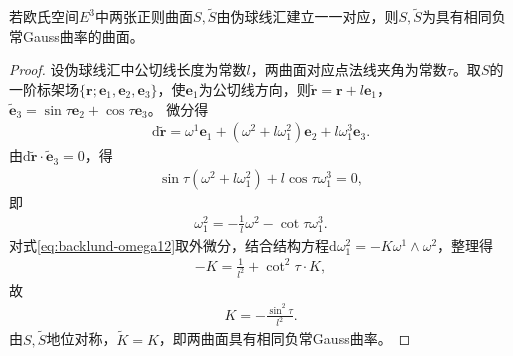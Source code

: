 \documentclass[../../main.tex]{subfiles}%
\begin{document}
\begin{theorem}[Bäcklund定理]
若欧氏空间$E^3$中两张正则曲面$S,\tilde{S}$由伪球线汇建立一一对应，则$S,\tilde{S}$为具有相同负常Gauss曲率的曲面。
\end{theorem}

\begin{proof}

设伪球线汇中公切线长度为常数$l$，两曲面对应点法线夹角为常数$\tau$。取$S$的一阶标架场$\{\boldsymbol{r};\boldsymbol{e}_1,\boldsymbol{e}_2,\boldsymbol{e}_3\}$，使$\boldsymbol{e}_1$为公切线方向，则$\tilde{\boldsymbol{r}}=\boldsymbol{r}+l\boldsymbol{e}_1$，$\tilde{\boldsymbol{e}}_3=\sin\tau\boldsymbol{e}_2+\cos\tau\boldsymbol{e}_3$。
微分得
\begin{align*}
\mathrm{d}\tilde{\boldsymbol{r}}=\omega^1\boldsymbol{e}_1+(\omega^2+l\omega_1^2)\boldsymbol{e}_2+l\omega_1^3\boldsymbol{e}_3.
\end{align*}
由$\mathrm{d}\tilde{\boldsymbol{r}}\cdot\tilde{\boldsymbol{e}}_3=0$，得
\begin{align*}
\sin\tau(\omega^2+l\omega_1^2)+l\cos\tau\omega_1^3=0,
\end{align*}
即
\begin{align}
\omega_1^2=-\frac{1}{l}\omega^2-\cot\tau\omega_1^3.\label{eq:backlund-omega12}
\end{align}
对式\eqref{eq:backlund-omega12}取外微分，结合结构方程$\mathrm{d}\omega_1^2=-K\omega^1\wedge\omega^2$，整理得
\begin{align*}
-K=\frac{1}{l^2}+\cot^2\tau\cdot K,
\end{align*}
故
\begin{align}
K=-\frac{\sin^2\tau}{l^2}.\label{eq:backlund-K}
\end{align}
由$S,\tilde{S}$地位对称，$\tilde{K}=K$，即两曲面具有相同负常Gauss曲率。

\end{proof}
\end{document}
